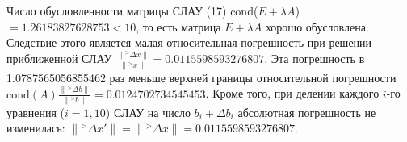 \documentclass[a4paper, 12pt]{extarticle}
\begin{document}
\section*{}

\begin{spacing}{1.5}
Число обусловленности матрицы СЛАУ (17) cond($E + \lambda A$) $= 1.26183827628753 < 10$, то есть матрица $E + \lambda A$ хорошо обусловлена. 
Следствие этого является малая относительная погрешность при решении приближенной СЛАУ $\frac{\lVert {^> \Delta x} \rVert}{\lVert {^>x} \rVert} = 0.0115598593276807$.
Эта погрешность в 1.0787565056855462 раз меньше верхней границы относительной погрешности $\textrm{cond}(A) \frac{\lVert {^> \Delta b} \rVert}{\lVert {^>b} \rVert} = 0.0124702734545453$.
Кроме того, при делении каждого $i$-го уравнения ($i = \overline{1, 10}$) СЛАУ на число $b_i + \Delta b_i$ абсолютная погрешность не изменилась: $\lVert {^> \Delta x'} \rVert = \lVert {^> \Delta x} \rVert = 0.0115598593276807 $.
\end{spacing}
\end{document}
